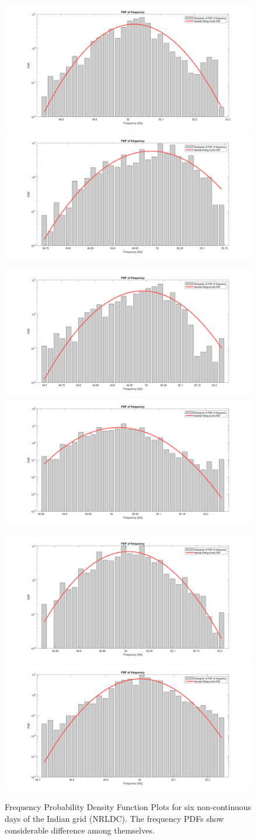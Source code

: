 \begin{figure}[htp]
	\centering
	\includegraphics[width=.45\textwidth]{../figures/pdf/nrldc/pdf_frequency_nrldc_01}\quad
	\includegraphics[width=.45\textwidth]{../figures/pdf/nrldc/pdf_frequency_nrldc_02}
	
	\medskip
	
	\includegraphics[width=.45\textwidth]{../figures/pdf/nrldc/pdf_frequency_nrldc_03}\quad
	\includegraphics[width=.45\textwidth]{../figures/pdf/nrldc/pdf_frequency_nrldc_04}
	
	\medskip
	
	\includegraphics[width=.45\textwidth]{../figures/pdf/nrldc/pdf_frequency_nrldc_05}\quad
	\includegraphics[width=.45\textwidth]{../figures/pdf/nrldc/pdf_frequency_nrldc_06}
	
	\caption{Frequency Probability Density Function Plots for six non-continuous days of the Indian grid (NRLDC). The frequency PDFs show considerable difference among themselves.}
\end{figure}

